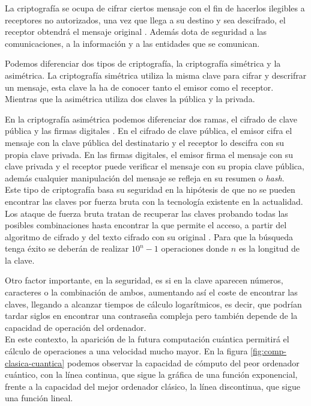 La criptografía se ocupa de cifrar ciertos mensaje con el fin de hacerlos ilegibles a receptores no autorizados, una vez que llega a su destino y sea descifrado, el receptor obtendrá el mensaje original \cite{criptografia}. Además dota de seguridad a las comunicaciones, a la información y a las entidades que se comunican.

Podemos diferenciar dos tipos de criptografía, la criptografía simétrica y la asimétrica. La criptografía simétrica utiliza la misma clave para cifrar y descrifrar un mensaje, esta clave la ha de conocer tanto el emisor como el receptor. Mientras que la asimétrica utiliza dos claves la pública y la privada.

En la criptografía asimétrica podemos diferenciar dos ramas, el cifrado de clave pública y las firmas digitales \cite{criptografia-asimetrica}. En el cifrado de clave pública, el emisor cifra el mensaje con la clave pública del destinatario y el receptor lo descifra con su propia clave privada. En las firmas digitales, el emisor firma el mensaje con su clave privada y el receptor puede verificar el mensaje con su propia clave pública, además cualquier manipulación del mensaje se refleja en su resumen o \textit{hash}.\\

Este tipo de criptografía basa su seguridad en la hipótesis de que no se pueden encontrar las claves por fuerza bruta con la tecnología existente en la actualidad. Los ataque de fuerza bruta tratan de recuperar las claves probando todas las posibles combinaciones hasta encontrar la que permite el acceso, a partir del algoritmo de cifrado y del texto cifrado con su original \cite{fuerza-bruta}. Para que la búsqueda tenga éxito se deberán de realizar $10^n-1$ operaciones donde $n$ es la longitud de la clave. 

Otro factor importante, en la seguridad, es si en la clave aparecen números, caracteres o la combinación de ambos, aumentando así el coste de encontrar las claves, llegando a alcanzar tiempos de cálculo logarítmicos, es decir, que podrían tardar siglos en encontrar una contraseña compleja pero también depende de la capacidad de operación del ordenador.\\

En este contexto, la aparición de la futura computación cuántica permitirá el cálculo de operaciones a una velocidad mucho mayor. En la figura \ref{fig:comp-clasica-cuantica} podemos observar la capacidad de cómputo del peor ordenador cuántico, con la línea continua, que sigue la gráfica de una función exponencial, frente a la capacidad del mejor ordenador clásico, la línea discontinua, que sigue una función lineal.

